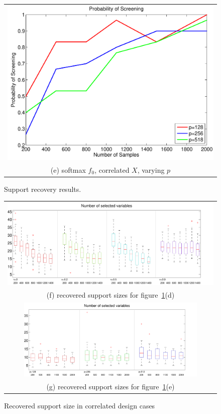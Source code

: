 \begin{figure}[!t]
\begin{center}
\begin{tabular}{cc}
\multicolumn{2}{c}{\includegraphics[width=.42\textwidth]{figs/CurveS}} \\
\multicolumn{2}{c}{(e) softmax $f_0$, correlated $X$, varying $p$} \\
\end{tabular}
\end{center}
\caption{Support recovery results.}
\label{Support}
\vskip10pt
\end{figure}

\begin{figure}
\begin{center}
\begin{tabular}{c}
\includegraphics[width=.84\textwidth]{figs/C_support_box}\\
(f) recovered support sizes for figure~\ref{Support}(d) \\
\includegraphics[width=0.84\textwidth]{figs/S_support_box}\\
(g) recovered support sizes for figure~\ref{Support}(e)
\end{tabular}
\end{center}
\caption{Recovered support size in correlated design cases}
\label{fig:support_size}
\end{figure}

